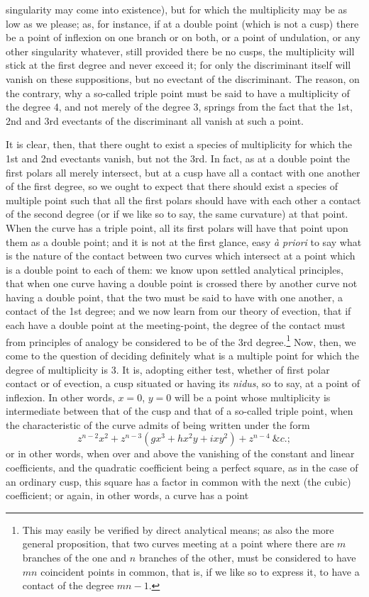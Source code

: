 \documentclass[11pt]{article}
\newcommand{\sourcepage}[1]{\marginpar{\scriptsize p.~#1}}
\begin{document}
{{\sourcepage{372}
singularity may come into existence), but for which the multiplicity may be as low as we please; as, for instance, if at a double point (which is not a cusp) there be a point of inflexion on one branch or on both, or a point of undulation, or any other singularity whatever, still provided there be no cusps, the multiplicity will stick at the first degree and never exceed it; for only the discriminant itself will vanish on these suppositions, but no evectant of the discriminant. The reason, on the contrary, why a so-called triple point must be said to have a multiplicity of the degree 4, and not merely of the degree 3, springs from the fact that the 1st, 2nd and 3rd evectants of the discriminant all vanish at such a point.

It is clear, then, that there ought to exist a species of multiplicity for which the 1st and 2nd evectants vanish, but not the 3rd. In fact, as at a double point the first polars all merely intersect, but at a cusp have all a contact with one another of the first degree, so we ought to expect that there should exist a species of multiple point such that all the first polars should have with each other a contact of the second degree (or if we like so to say, the same curvature) at that point. When the curve has a triple point, all its first polars will have that point upon them as a double point; and it is not at the first glance, easy \emph{à priori} to say what is the nature of the contact between two curves which intersect at a point which is a double point to each of them: we know upon settled analytical principles, that when one curve having a double point is crossed there by another curve not having a double point, that the two must be said to have with one another, a contact of the 1st degree; and we now learn from our theory of evection, that if each have a double point at the meeting-point, the degree of the contact must from principles of analogy be considered to be of the 3rd degree.\footnote{This may easily be verified by direct analytical means; as also the more general proposition, that two curves meeting at a point where there are $m$ branches of the one and $n$ branches of the other, must be considered to have $mn$ coincident points in common, that is, if we like so to express it, to have a contact of the degree $mn-1$.} Now, then, we come to the question of deciding definitely what is a multiple point for which the degree of multiplicity is 3. It is, adopting either test, whether of first polar contact or of evection, a cusp situated or having its \emph{nidus}, so to say, at a point of inflexion. In other words, $x=0$, $y=0$ will be a point whose multiplicity is intermediate between that of the cusp and that of a so-called triple point, when the characteristic of the curve admits of being written under the form
\[
z^{n-2}x^2+z^{n-3}(gx^3+hx^2y+ixy^2)+z^{n-4}\ \&c.;
\]
or in other words, when over and above the vanishing of the constant and linear coefficients, and the quadratic coefficient being a perfect square, as in the case of an ordinary cusp, this square has a factor in common with the next (the cubic) coefficient; or again, in other words, a curve has a point

}}
\end{document}
